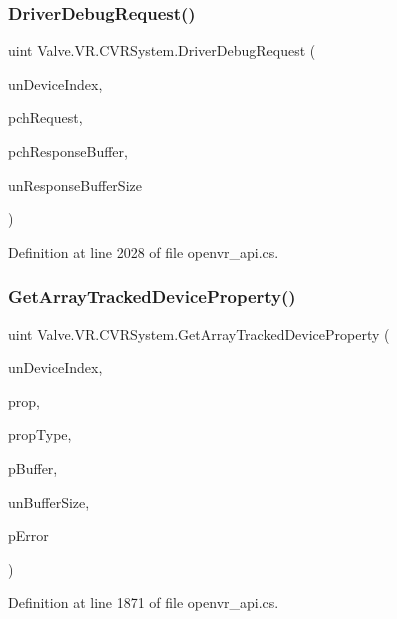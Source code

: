 \subsubsection{\texorpdfstring{DriverDebugRequest()}{DriverDebugRequest()}}
{\footnotesize\ttfamily uint Valve.\+V\+R.\+C\+V\+R\+System.\+Driver\+Debug\+Request (\begin{DoxyParamCaption}\item[{uint}]{un\+Device\+Index,  }\item[{string}]{pch\+Request,  }\item[{System.\+Text.\+String\+Builder}]{pch\+Response\+Buffer,  }\item[{uint}]{un\+Response\+Buffer\+Size }\end{DoxyParamCaption})}



Definition at line 2028 of file openvr\+\_\+api.\+cs.

\mbox{\label{class_valve_1_1_v_r_1_1_c_v_r_system_abf54d8807c8b17fd968b0d46b405c56d}} 
\subsubsection{\texorpdfstring{GetArrayTrackedDeviceProperty()}{GetArrayTrackedDeviceProperty()}}
{\footnotesize\ttfamily uint Valve.\+V\+R.\+C\+V\+R\+System.\+Get\+Array\+Tracked\+Device\+Property (\begin{DoxyParamCaption}\item[{uint}]{un\+Device\+Index,  }\item[{\mbox{\hyperlink{namespace_valve_1_1_v_r_ab060521ead7273986988fc4897e52482}{E\+Tracked\+Device\+Property}}}]{prop,  }\item[{uint}]{prop\+Type,  }\item[{Int\+Ptr}]{p\+Buffer,  }\item[{uint}]{un\+Buffer\+Size,  }\item[{ref \mbox{\hyperlink{namespace_valve_1_1_v_r_aab6684f03930a2d2cf22ed66b437e47b}{E\+Tracked\+Property\+Error}}}]{p\+Error }\end{DoxyParamCaption})}



Definition at line 1871 of file openvr\+\_\+api.\+cs.

